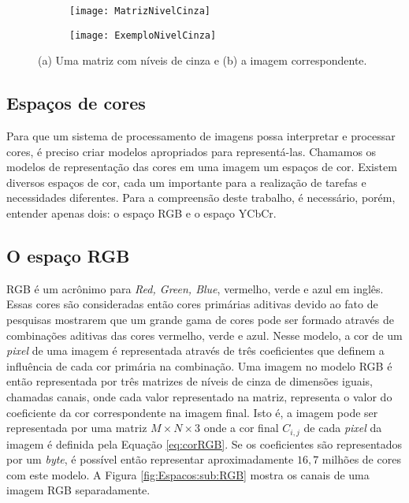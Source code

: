 \begin{figure}
 \centering
\begin{subfigure}{.5\textwidth}
  \centering
  \texttt{[image: MatrizNivelCinza]}
  \caption{}
  \label{exemplo:sfig1}
  \centering
\end{subfigure}%
\begin{subfigure}{.5\textwidth}
  \centering
  \texttt{[image: ExemploNivelCinza]}
  \caption{}
  \label{exemplo:sfig2}
  \centering
\end{subfigure}
\caption{(a) Uma matriz com níveis de cinza e (b) a imagem correspondente.}
\label{fig:NivelCinza}
\centering
\end{figure}


\subsection{Espaços de cores}

Para que um sistema de processamento de imagens possa interpretar e processar cores, é preciso criar modelos apropriados para representá-las. Chamamos os modelos de representação das cores em uma imagem um espaços de cor. Existem diversos espaços de cor, cada um importante para a realização de tarefas e necessidades diferentes. Para a compreensão deste trabalho, é necessário, porém, entender apenas dois: o espaço RGB e o espaço YCbCr.

\subsection{O espaço RGB}


RGB é um acrônimo para \textit{Red, Green, Blue}, vermelho, verde e azul em inglês. Essas cores são consideradas então cores primárias aditivas devido ao fato de pesquisas mostrarem que um grande gama de cores pode ser formado através de combinações aditivas das cores vermelho, verde e azul\cite{IBGE2000introducao}. Nesse modelo, a cor de um \textit{pixel} de uma imagem é representada através de três coeficientes que definem a influência de cada cor primária na combinação. Uma imagem no modelo RGB é então representada por três matrizes de níveis de cinza de dimensões iguais, chamadas canais, onde cada valor representado na matriz, representa o valor do coeficiente da cor correspondente na imagem final. Isto é, a imagem pode ser representada por uma matriz $M\times N\times 3$ onde a cor final $C_{i,j}$ de cada \textit{pixel} da imagem é definida pela Equação \ref{eq:corRGB}. Se os coeficientes são representados por um \textit{byte}, é possível então representar aproximadamente $16,7$ milhões de cores com este modelo. A Figura \ref{fig:Espacos:sub:RGB} mostra os canais de uma imagem RGB separadamente.


